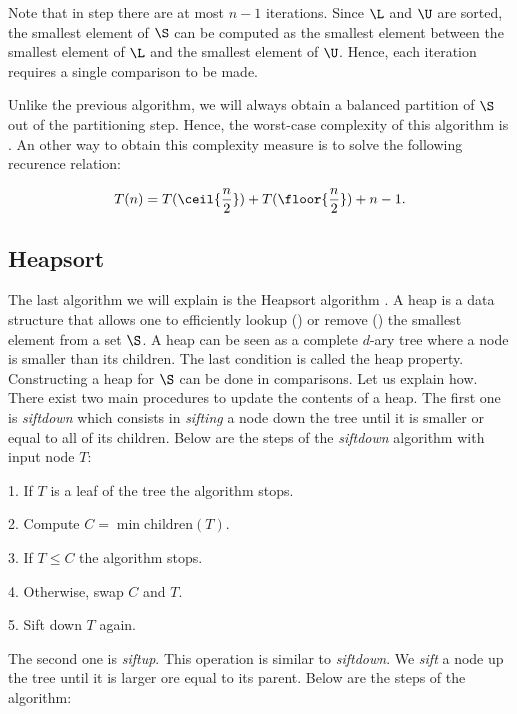 Note that in step  there are at most \(n - 1\) iterations. Since \(\L\)
and \(\U\) are sorted, the smallest element of \(\S\) can be computed as the
smallest element between the smallest element of \(\L\) and the smallest
element of \(\U\). Hence, each iteration requires a single comparison to be
made.

Unlike the previous algorithm, we will always obtain a balanced partition of
\(\S\) out of the partitioning step. Hence, the worst-case complexity of this
algorithm is . An other way to obtain this complexity measure
is to solve the following recurence relation:

\begin{displaymath}
T(n) = T(\ceil{\frac{n}{2}}) + T(\floor{\frac{n}{2}}) + n - 1.
\end{displaymath}

\subsection*{Heapsort}

The last algorithm we will explain is the Heapsort algorithm
\cite{leiserson:2001}. A heap is a data
structure that allows one to efficiently lookup () or
remove () the smallest element from a set \(\S\). A heap can
be seen as a complete \(d\)-ary tree where a node is smaller than its
children. The last condition is called the heap property.
Constructing a heap for \(\S\) can be done in  comparisons.
Let us explain how. There exist two main procedures to update the contents of
a heap. The first one is \emph{siftdown} which consists in \emph{sifting} a
node down the tree until it is smaller or equal to all of its children. Below
are the steps of the \emph{siftdown} algorithm with input node \(T\):

\begin{algorithm}
\item[1.] If \(T\) is a leaf of the tree the algorithm stops.
\item[2.] Compute \(C = \min \text{children}(T)\).
\item[3.] If \(T \le C\) the algorithm stops.
\item[4.] Otherwise, swap \(C\) and \(T\).
\item[5.] Sift down \(T\) again.
\end{algorithm}

The second one is \emph{siftup}. This operation is similar to \emph{siftdown}.
We \emph{sift} a node up the tree until it is larger ore equal to its parent.
Below are the steps of the algorithm:


